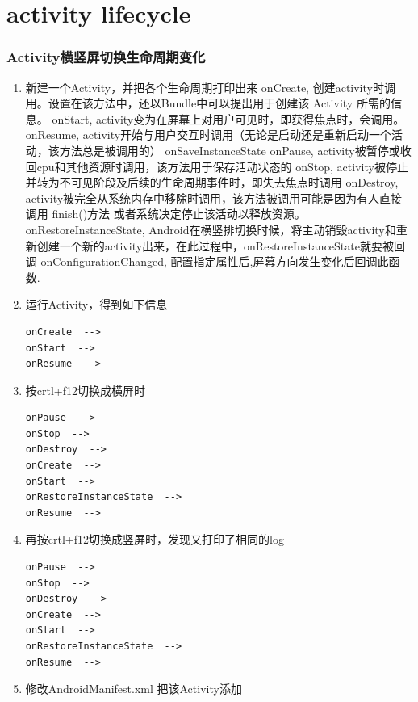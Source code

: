 \documentclass[9pt, b5paaper]{book}
\begin{document}
\chapter{activity lifecycle}
\label{sec-8}
\subsection{Activity横竖屏切换生命周期变化}
\label{sec-8-0-1}
\begin{enumerate}
\item 新建一个Activity，并把各个生命周期打印出来
\label{sec-8-0-1-1}
onCreate,
创建activity时调用。设置在该方法中，还以Bundle中可以提出用于创建该 Activity 所需的信息。
onStart,
activity变为在屏幕上对用户可见时，即获得焦点时，会调用。
onResume,
activity开始与用户交互时调用（无论是启动还是重新启动一个活动，该方法总是被调用的）
onSaveInstanceState
onPause,
activity被暂停或收回cpu和其他资源时调用，该方法用于保存活动状态的
onStop,
activity被停止并转为不可见阶段及后续的生命周期事件时，即失去焦点时调用
onDestroy,
activity被完全从系统内存中移除时调用，该方法被调用可能是因为有人直接调用 finish()方法 或者系统决定停止该活动以释放资源。
onRestoreInstanceState,
Android在横竖排切换时候，将主动销毁activity和重新创建一个新的activity出来，在此过程中，onRestoreInstanceState就要被回调
onConfigurationChanged,
配置指定属性后,屏幕方向发生变化后回调此函数.
\item 运行Activity，得到如下信息
\label{sec-8-0-1-2}
\begin{verbatim}
onCreate  -->
onStart  -->
onResume  -->
\end{verbatim}
\item 按crtl+f12切换成横屏时
\label{sec-8-0-1-3}
\begin{verbatim}
onPause  -->
onStop  -->
onDestroy  -->
onCreate  -->
onStart  -->
onRestoreInstanceState  -->
onResume  -->
\end{verbatim}
\item 再按crtl+f12切换成竖屏时，发现又打印了相同的log
\label{sec-8-0-1-4}
\begin{verbatim}
onPause  -->
onStop  -->
onDestroy  -->
onCreate  -->
onStart  -->
onRestoreInstanceState  -->
onResume  -->
\end{verbatim}
\item 修改AndroidManifest.xml
\label{sec-8-0-1-5}
把该Activity添加
\begin{verbatim}

\end{verbatim}
\end{enumerate}
\end{document}
